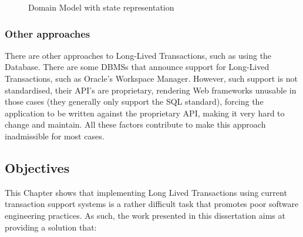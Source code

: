 \documentclass{llncs}
\begin{document}
\begin{figure}
  \centering

\caption{Domain Model with state representation}
\label{fig:courseDomainState}

\end{figure}

\subsubsection{Other approaches}

There are other approaches to Long-Lived Transactions, such as using
the Database. There are some DBMSs that announce support for
Long-Lived Transactions, such as Oracle's Workspace Manager. However,
such support is not standardised, their API's are proprietary,
rendering Web frameworks unusable in those cases (they generally only
support the SQL standard), forcing the application to be written
against the proprietary API, making it very hard to change and
maintain. All these factors contribute to make this approach
inadmissible for most cases.

\subsection{Objectives}

This Chapter shows that implementing Long Lived Transactions using
current transaction support systems is a rather difficult task that
promotes poor software engineering practices. As such, the work
presented in this dissertation aims at providing a solution that:
\end{document}
